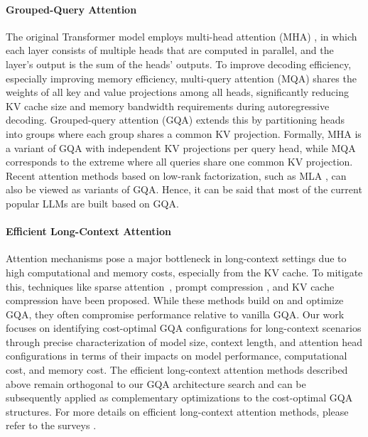 \documentclass[11pt]{article}
\begin{document}
\paragraph{Grouped-Query Attention}
The original Transformer model employs multi-head attention (MHA) \citep{transformer}, in which each layer consists of multiple heads that are computed in parallel, and the layer's output is the sum of the heads' outputs. To improve decoding efficiency, especially improving memory efficiency, multi-query attention (MQA) \citep{mqa} shares the weights of all key and value projections among all heads, significantly reducing KV cache size and memory bandwidth requirements during autoregressive decoding. Grouped-query attention (GQA) \citep{gqa} extends this by partitioning heads into groups where each group shares a common KV projection. Formally, MHA is a variant of GQA with independent KV projections per query head, while MQA corresponds to the extreme where all queries share one common KV projection. Recent attention methods based on low-rank factorization, such as MLA \citep{deepseek-v2}, can also be viewed as variants of GQA. Hence, it can be said that most of the current popular LLMs \cite{olmo,pythia,minicpm,llama3,qwen2.5} are built based on GQA. 

\paragraph{Efficient Long-Context Attention}
Attention mechanisms pose a major bottleneck in long-context settings due to high computational and memory costs, especially from the KV cache.
To mitigate this, techniques like sparse attention~\citep{lou2024sparserfastermoreefficient,ge2023model,jiang2024minference}, prompt compression \citep{llmlingua,xiao2023efficient}, and KV cache compression \citep{liu2024kivi,hooper2024kvquant,zhang2024h2o,yao2024sirllm,cai2024lococo} have been proposed. 
While these methods build on and optimize GQA, they often compromise performance relative to vanilla GQA.
Our work focuses on identifying cost-optimal GQA configurations for long-context scenarios through precise characterization of model size, context length, and attention head configurations in terms of their impacts on model performance, computational cost, and memory cost. The efficient long-context attention methods described above remain orthogonal to our GQA architecture search and can be subsequently applied as complementary optimizations to the cost-optimal GQA structures. For more details on efficient long-context attention methods, please refer to the surveys \citep{yuan2024kv,luohe2024keep}.
\end{document}
